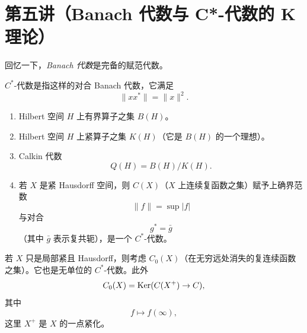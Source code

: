 \section{第五讲（Banach 代数与 C*-代数的 K 理论）}

回忆一下，\emph{Banach 代数}是完备的赋范代数。

$C^*$-代数是指这样的对合 Banach 代数，它满足
\[
  \|xx^*\| = \|x\|^2.
\]

\begin{enumerate}[label=\alph*.]
\item Hilbert 空间 $H$ 上有界算子之集 $B(H)$。
\item Hilbert 空间 $H$ 上紧算子之集 $K(H)$（它是 $B(H)$ 的一个理想）。
\item Calkin 代数
  \[
    Q(H) = B(H)/K(H).
  \]
\item 若 $X$ 是紧 Hausdorff 空间，则 $C(X)$（$X$ 上连续复函数之集）赋予上确界范数
  \[
    \|f\| = \sup |f|
  \]
  与对合
  \[
    g^* = \bar g
  \]
  （其中 $\bar g$ 表示复共轭），是一个 $C^*$-代数。
\end{enumerate}


若 $X$ 只是局部紧且 Hausdorff，则考虑 $C_0(X)$（在无穷远处消失的复连续函数之集）。它也是无单位的 $C^*$-代数。此外
\[
  C_0(X) = \operatorname{Ker}(C(X^+)\to C),
\]
其中
\[
  f\mapsto f(\infty),
\]
这里 $X^+$ 是 $X$ 的一点紧化。

